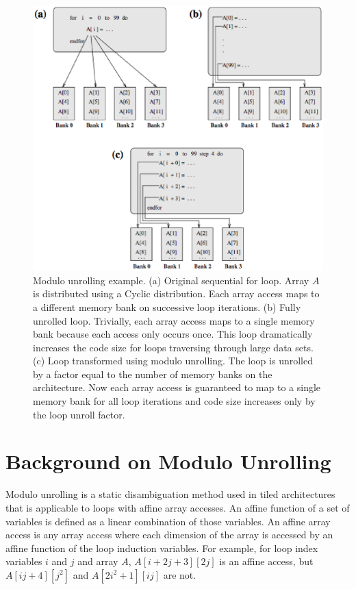 \begin{figure}
\begin{center}
\includegraphics[scale=0.45]{./Figures/modulo_unrolling.eps}
\caption{Modulo unrolling example. (a) Original sequential for loop. Array $A$ is distributed using a Cyclic distribution. Each array access maps to a different memory bank on successive loop iterations. (b) Fully unrolled loop. Trivially, each array access maps to a single memory bank because each access only occurs once. This loop dramatically increases the code size for loops traversing through large data sets. (c) Loop transformed using modulo unrolling. The loop is unrolled by a factor equal to the number of memory banks on the architecture. Now each array access is guaranteed to map to a single memory bank for all loop iterations and code size increases only by the loop unroll factor.}
\label{modulo_unrolling}
\end{center}
\end{figure}

\section{Background on Modulo Unrolling}\label{sec:modulo_unrolling}

Modulo unrolling \cite{barua1999maps} is a static disambiguation method used in tiled architectures that is applicable to loops with affine array accesses. An affine function of a set of variables is defined as a linear combination of those variables. An affine array access is any array access where each dimension of the array is accessed by an affine function of the loop induction variables. For example, for loop index variables $i$ and $j$ and array $A$, $A[i+2j+3][2j]$ is an affine access, but $A[ij+4][j^2]$ and $A[2i^2+1][ij]$ are not. 

